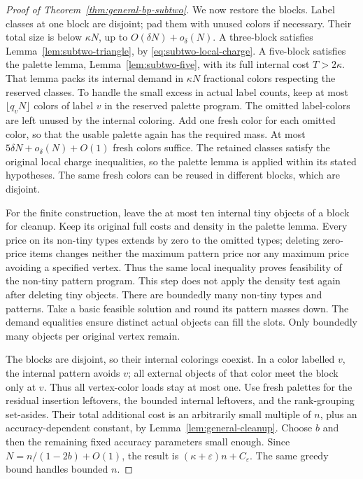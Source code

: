 \documentclass[11pt]{article}
\theoremstyle{definition}\newtheorem{algorithm}{Algorithm}[section]
\numberwithin{equation}{section}
\theoremstyle{remark}\newtheorem*{remark}{Remark}
\begin{document}
\begin{proof}[Proof of Theorem~\ref{thm:general-bp-subtwo}]
We now restore the blocks. Label classes at one block are disjoint;
pad them with unused colors if necessary. Their total size is below
$\kappa N$, up to $O(\delta N)+o_\delta(N)$.
A three-block satisfies Lemma~\ref{lem:subtwo-triangle}, by
\eqref{eq:subtwo-local-charge}. A five-block satisfies the
palette lemma, Lemma~\ref{lem:subtwo-five}, with its full
internal cost $T>2\kappa$. That lemma packs its internal demand
in $\kappa N$ fractional colors respecting the reserved classes.
To handle the small excess in actual label counts, keep at most
$\lfloor q_vN\rfloor$ colors of label $v$ in the reserved palette
program. The omitted label-colors are left unused by the internal
coloring. Add one fresh color for each omitted color, so that the
usable palette again has the required mass. At most
$5\delta N+o_\delta(N)+O(1)$ fresh colors suffice. The retained
classes satisfy the original local charge inequalities, so the
palette lemma is applied within its stated hypotheses. The same
fresh colors can be reused in different blocks, which are disjoint.

For the finite construction, leave the at most ten internal tiny
objects of a block for cleanup. Keep its original full costs and
density in the palette lemma. Every price on its non-tiny types
extends by zero to the omitted types; deleting zero-price items
changes neither the maximum pattern price nor any maximum price
avoiding a specified vertex. Thus the same local inequality proves
feasibility of the non-tiny pattern program. This step does not
apply the density test again after deleting tiny objects.
There are boundedly many non-tiny types and patterns. Take a basic
feasible solution and round its pattern masses down. The demand
equalities ensure distinct actual objects can fill the slots.
Only boundedly many objects per original vertex remain.

The blocks are disjoint, so their internal colorings coexist.
In a color labelled $v$, the internal pattern avoids $v$; all
external objects of that color meet the block only at $v$.
Thus all vertex-color loads stay at most one.
Use fresh palettes for the residual insertion leftovers, the
bounded internal leftovers, and the rank-grouping set-asides.
Their total additional cost is an arbitrarily small multiple of
$n$, plus an accuracy-dependent constant, by
Lemma~\ref{lem:general-cleanup}.
Choose $b$ and then the remaining fixed accuracy parameters small
enough. Since $N=n/(1-2b)+O(1)$, the result is
$(\kappa+\varepsilon)n+C_\varepsilon$.
The same greedy bound handles bounded $n$.
\end{proof}
\end{document}
